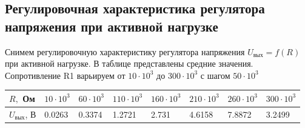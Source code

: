 \documentclass[a4paper, 12pt]{article}
\begin{document}
    \subsection{Регулировочная характеристика регулятора напряжения при активной нагрузке}
    Снимем регулировочную характеристику регулятора напряжения $U_{\text{вых}}=f\left( R \right)$
    при активной нагрузке. В таблице представлены средние значения. Сопротивление R1 варьируем от $10\cdot10^3$ до $300\cdot10^3$
    с шагом $50\cdot10^3$
    \begin{center}
        \begin{tabular}{ | m{4em} | m{1.5cm}| m{1.5cm} | m{1.5cm} | m{1.5cm} | m{1.5cm} | m{1.5cm} | m{1.5cm} | } 
        \hline
        $R,$ Ом& $10\cdot10^3$ & $60\cdot10^3$ & $110\cdot10^3$ &$160\cdot10^3$ &$210\cdot10^3$ &$260\cdot10^3$ &$300\cdot10^3$ \\ 
        \hline
        $U_{\text{вых}}$, В& 0.0263 & 0.3374 & 1.2721 &2.731 &4.6158 &7.8872 &3.2499\\ 
        \hline
    \end{tabular}
    \end{center}
\end{document}
